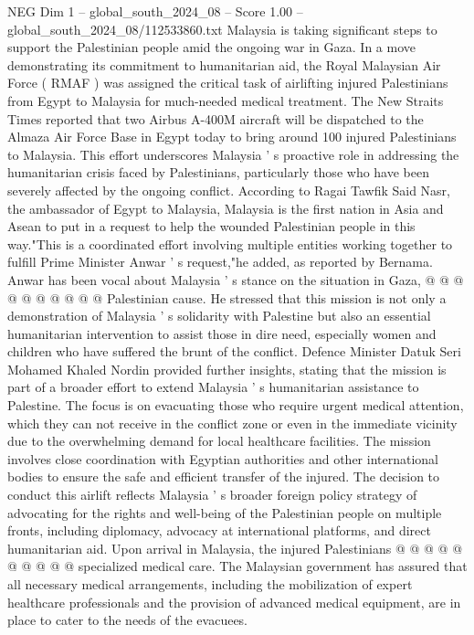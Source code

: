 \begin{textsample}{NEG Dim 1 – global\_south\_2024\_08 – Score 1.00 – global\_south\_2024\_08/112533860.txt}  \label{ex:f1_neg_446}
Malaysia is taking significant steps to support the Palestinian people amid the ongoing war in Gaza.
In a move demonstrating its commitment to humanitarian aid, the Royal Malaysian Air Force ( RMAF ) was assigned the critical task of airlifting injured Palestinians from Egypt to Malaysia for much-needed medical treatment.
The New Straits Times reported that two Airbus A-400M aircraft will be dispatched to the Almaza Air Force Base in Egypt today to bring around 100 injured Palestinians to Malaysia.
This effort underscores Malaysia ' s proactive role in addressing the humanitarian crisis faced by Palestinians, particularly those who have been severely affected by the ongoing conflict.
According to Ragai Tawfik Said Nasr, the ambassador of Egypt to Malaysia, Malaysia is the first nation in Asia and Asean to put in a request to help the wounded Palestinian people in this way."This is a coordinated effort involving multiple entities working together to fulfill Prime Minister Anwar ' s request,"he added, as reported by Bernama.
Anwar has been vocal about Malaysia ' s stance on the situation in Gaza, @ @ @ @ @ @ @ @ @ @ Palestinian cause.
He stressed that this mission is not only a demonstration of Malaysia ' s solidarity with Palestine but also an essential humanitarian intervention to assist those in dire need, especially women and children who have suffered the brunt of the conflict.
Defence Minister Datuk Seri Mohamed Khaled Nordin provided further insights, stating that the mission is part of a broader effort to extend Malaysia ' s humanitarian assistance to Palestine.
The focus is on evacuating those who require urgent medical attention, which they can not receive in the conflict zone or even in the immediate vicinity due to the overwhelming demand for local healthcare facilities.
The mission involves close coordination with Egyptian authorities and other international bodies to ensure the safe and efficient transfer of the injured.
The decision to conduct this airlift reflects Malaysia ' s broader foreign policy strategy of advocating for the rights and well-being of the Palestinian people on multiple fronts, including diplomacy, advocacy at international platforms, and direct humanitarian aid.
Upon arrival in Malaysia, the injured Palestinians @ @ @ @ @ @ @ @ @ @ specialized medical care.
The Malaysian government has assured that all necessary medical arrangements, including the mobilization of expert healthcare professionals and the provision of advanced medical equipment, are in place to cater to the needs of the evacuees.

\end{textsample}
